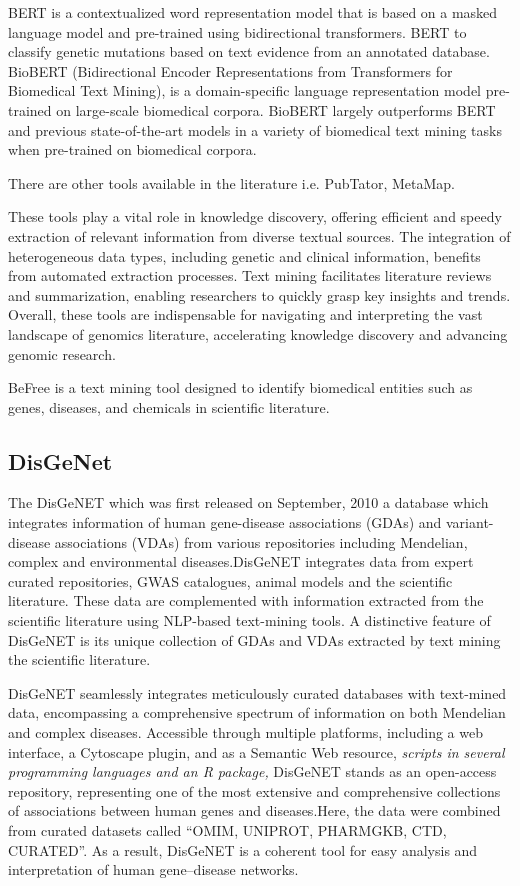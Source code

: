 BERT\cite{22} is a contextualized word representation model that is based on a masked language model and pre-trained using bidirectional transformers. BERT to classify genetic mutations based on text evidence from an annotated database\cite{23}. BioBERT (Bidirectional Encoder Representations from Transformers for Biomedical Text Mining), is a domain-specific language representation model pre-trained on large-scale biomedical corpora. BioBERT largely outperforms BERT and previous state-of-the-art models in a variety of biomedical text mining tasks when pre-trained on biomedical corpora.\cite{24}

There are other tools available in the literature i.e. PubTator\cite{25}, MetaMap\cite{26}.

These tools play a vital role in knowledge discovery, offering efficient and speedy extraction of relevant information from diverse textual sources. The integration of heterogeneous data types, including genetic and clinical information, benefits from automated extraction processes. Text mining facilitates literature reviews and summarization, enabling researchers to quickly grasp key insights and trends. Overall, these tools are indispensable for navigating and interpreting the vast landscape of genomics literature, accelerating knowledge discovery and advancing genomic research.

BeFree is a text mining tool designed to identify biomedical entities such as genes, diseases, and chemicals in scientific literature.

 
\subsection{DisGeNet}

The DisGeNET which was first released on September, 2010 a database which integrates information of human gene-disease associations (GDAs) and variant-disease associations (VDAs) from various repositories including Mendelian, complex and environmental diseases.DisGeNET integrates data from expert curated repositories, GWAS catalogues, animal models and the scientific literature. These data are complemented with information extracted from the scientific literature using NLP-based text-mining tools. A distinctive feature of DisGeNET is its unique collection of GDAs and VDAs extracted by text mining the scientific literature.\cite{27}

DisGeNET seamlessly integrates meticulously curated databases with text-mined data, encompassing a comprehensive spectrum of information on both Mendelian and complex diseases. Accessible through multiple platforms, including a web interface, a Cytoscape plugin, and as a Semantic Web resource, \textit{scripts in several programming languages and an R package,} DisGeNET stands as an open-access repository, representing one of the most extensive and comprehensive collections of associations between human genes and diseases.Here, the data were combined from curated datasets called “OMIM, UNIPROT, PHARMGKB, CTD, CURATED”. As a result, DisGeNET is a coherent tool for easy analysis and interpretation of human gene–disease networks.



